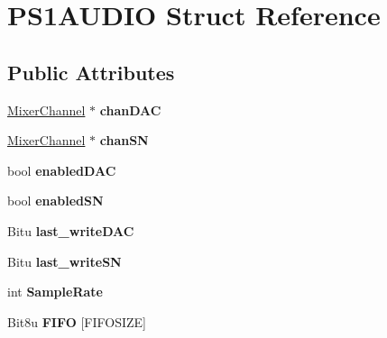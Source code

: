 \hypertarget{structPS1AUDIO}{\section{P\-S1\-A\-U\-D\-I\-O Struct Reference}
\label{structPS1AUDIO}
}
\subsection*{Public Attributes}
\begin{DoxyCompactItemize}
\item 
\hypertarget{structPS1AUDIO_a7287232a0cfd2c6891d053684ffae477}{\hyperlink{classMixerChannel}{Mixer\-Channel} $\ast$ {\bfseries chan\-D\-A\-C}}\label{structPS1AUDIO_a7287232a0cfd2c6891d053684ffae477}

\item 
\hypertarget{structPS1AUDIO_a396c28c237bd5862b0db07f43d81e980}{\hyperlink{classMixerChannel}{Mixer\-Channel} $\ast$ {\bfseries chan\-S\-N}}\label{structPS1AUDIO_a396c28c237bd5862b0db07f43d81e980}

\item 
\hypertarget{structPS1AUDIO_a520295e0b096d5645df68c07ec94315a}{bool {\bfseries enabled\-D\-A\-C}}\label{structPS1AUDIO_a520295e0b096d5645df68c07ec94315a}

\item 
\hypertarget{structPS1AUDIO_a7b0781147e241d9c9c76381bb5dc8401}{bool {\bfseries enabled\-S\-N}}\label{structPS1AUDIO_a7b0781147e241d9c9c76381bb5dc8401}

\item 
\hypertarget{structPS1AUDIO_af3993fa0a7c45e5d3368974fc64ef23a}{Bitu {\bfseries last\-\_\-write\-D\-A\-C}}\label{structPS1AUDIO_af3993fa0a7c45e5d3368974fc64ef23a}

\item 
\hypertarget{structPS1AUDIO_a3a5a96e25c3a5b41d019a11257746a5e}{Bitu {\bfseries last\-\_\-write\-S\-N}}\label{structPS1AUDIO_a3a5a96e25c3a5b41d019a11257746a5e}

\item 
\hypertarget{structPS1AUDIO_a877541fed8ba288473ec7abd62fdb667}{int {\bfseries Sample\-Rate}}\label{structPS1AUDIO_a877541fed8ba288473ec7abd62fdb667}

\item 
\hypertarget{structPS1AUDIO_a6e99cc3f43f7dfbe3a7036928bcc9a19}{Bit8u {\bfseries F\-I\-F\-O} \mbox{[}F\-I\-F\-O\-S\-I\-Z\-E\mbox{]}}\label{structPS1AUDIO_a6e99cc3f43f7dfbe3a7036928bcc9a19}


\end{DoxyCompactItemize}
